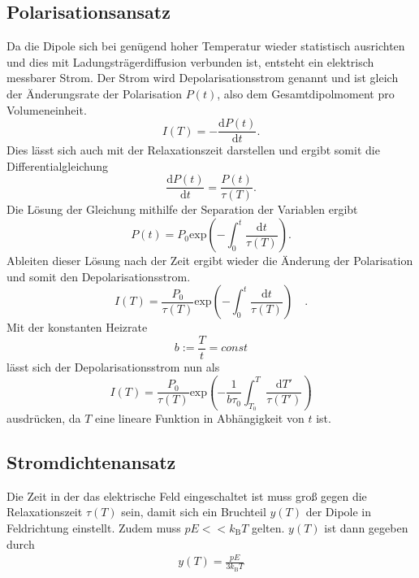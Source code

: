 \subsection{Polarisationsansatz}
\label{subsec:polarisation}

Da die Dipole sich bei genügend hoher Temperatur wieder statistisch ausrichten und dies mit Ladungsträgerdiffusion verbunden ist,
entsteht ein elektrisch messbarer Strom.
Der Strom wird Depolarisationsstrom genannt und ist gleich der Änderungsrate der 
Polarisation $P(t)$, also dem Gesamtdipolmoment pro Volumeneinheit.
\begin{equation}
    I(T) = - \frac{\text{d}P(t)}{\text{d}t}.
\end{equation}
Dies lässt sich auch mit der Relaxationszeit darstellen und ergibt somit die Differentialgleichung
\begin{equation}
    \frac{\text{d} P(t)}{\text{d} t} = \frac{P(t)}{\tau(T)}.
    \label{eqn:diff}
\end{equation}
Die Lösung der Gleichung mithilfe der Separation der Variablen ergibt
\begin{equation}
    P(t) = P_0 \text{exp}\left(-\int_0^t\frac{\text{d}t}{\tau(T)}\right).
\end{equation}
Ableiten dieser Lösung nach der Zeit ergibt wieder die Änderung der Polarisation und somit den 
Depolarisationsstrom.
\begin{equation}
    I(T) = \frac{P_0}{\tau(T)} \text{exp}\left(-\int_0^t\frac{\text{d}t}{\tau(T)}\right) \quad.
    \end{equation}
Mit der konstanten Heizrate
\begin{equation}
    b := \frac{T}{t} = const
\end{equation}
lässt sich der Depolarisationsstrom nun als 
\begin{equation}
    I(T) = \frac{P_0}{\tau(T)} \text{exp}\left(-\frac{1}{b\tau_0}\int_{T_0}^T\frac{\text{d}T'}{\tau(T')}\right)
\end{equation}
ausdrücken, da $T$ eine lineare Funktion in Abhängigkeit von $t$ ist.

\subsection{Stromdichtenansatz}

Die Zeit in der das elektrische Feld eingeschaltet ist muss groß gegen die Relaxationszeit $\tau(T)$ sein, 
damit sich ein Bruchteil $y(T)$ der Dipole in Feldrichtung einstellt.
Zudem muss $pE << k_\text{B}T$ gelten.
$y(T)$ ist dann gegeben durch
\begin{align*}
    y(T)= \frac{pE}{3 k_\text{B}T}
\end{align*}

